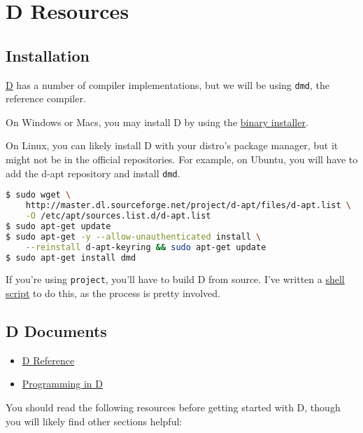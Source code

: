 \section{D Resources}\label{d-resources}

\subsection{Installation}\label{installation}

\href{http://dlang.org}{D} has a number of compiler implementations, but
we will be using \lstinline!dmd!, the reference compiler.

On Windows or Macs, you may install D by using the
\href{http://ftp.digitalmars.com/dinstaller.exe}{binary installer}.

On Linux, you can likely install D with your distro's package manager,
but it might not be in the official repositories. For example, on
Ubuntu, you will have to add the d-apt repository and install
\lstinline!dmd!.

\begin{lstlisting}[language=sh]
$ sudo wget \
    http://master.dl.sourceforge.net/project/d-apt/files/d-apt.list \
    -O /etc/apt/sources.list.d/d-apt.list
$ sudo apt-get update
$ sudo apt-get -y --allow-unauthenticated install \
    --reinstall d-apt-keyring && sudo apt-get update
$ sudo apt-get install dmd
\end{lstlisting}

If you're using \lstinline!project!, you'll have to build D from source.
I've written a \href{./install_d.sh}{shell script} to do this, as the
process is pretty involved.

\subsection{D Documents}\label{d-documents}

\begin{itemize}
\itemsep1pt\parskip0pt
\item
  \href{http://dlang.org/intro.html}{D Reference}
\item
  \href{http://ddili.org/ders/d.en/index.html}{Programming in D}
\end{itemize}

You should read the following resources before getting started with D,
though you will likely find other sections helpful:

